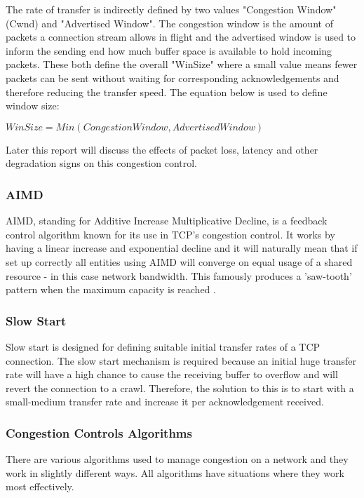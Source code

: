 The rate of transfer is indirectly defined by two values "Congestion Window" (Cwnd) and "Advertised Window". The congestion window is the amount of packets a connection stream allows in flight and the advertised window is used to inform the sending end how much buffer space is available to hold incoming packets. These both define the overall "WinSize" where a small value means fewer packets can be sent without waiting for corresponding acknowledgements and therefore reducing the transfer speed. The equation below is used to define window size: 

\begin{center}
	$WinSize = Min(CongestionWindow, AdvertisedWindow)$
\end{center}

Later this report will discuss the effects of packet loss, latency and other degradation signs on this congestion control.

 
\subsubsection*{AIMD}
AIMD, standing for Additive Increase Multiplicative Decline, is a feedback control algorithm known for its use in TCP's congestion control. It works by having a linear increase and exponential decline and it will naturally mean that if set up correctly all entities using AIMD will converge on equal usage of a shared resource - in this case network bandwidth. This famously produces a 'saw-tooth' pattern when the maximum capacity is reached \citep{huston2006gigabit}.

\subsubsection*{Slow Start}
\label{ref:slowstart}
Slow start is designed for defining suitable initial transfer rates of a TCP connection. The slow start mechanism is required because an initial huge transfer rate will have a high chance to cause the receiving buffer to overflow and will revert the connection to a crawl. Therefore, the solution to this is to start with a small-medium transfer rate and increase it per acknowledgement received.

\subsubsection*{Congestion Controls Algorithms}
There are various algorithms used to manage congestion on a network and they work in slightly different ways. All algorithms have situations where they work most effectively.


